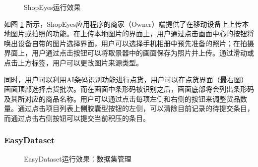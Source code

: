 \begin{figure}[htbp]
    \hfill
	\caption{ShopEyes运行效果}
	\label{fig:seo}
\end{figure}

如图 \ref{fig:seo} 所示，ShopEyes应用程序的商家（Owner）端提供了在移动设备上上传本地图片或拍照的功能。在上传本地图片的界面上，用户通过点击画面中心的按钮将唤出设备自带的图片选择界面，用户可以选择手机相册中预先准备的照片；在拍摄界面上，用户通过点击按钮可以将取景器中的画面保存为照片并上传。通过滑动或点击上方标签，用户可以更改图片来源类型。

同时，用户可以利用AI条码识别功能进行点货，用户可以在点货界面（最右图）画面顶部选择点货批次。而在画面中条形码被识别之后，画面底部将会列出条形码及其所对应的商品名称。用户可以通过点击每项左侧和右侧的按钮来调整货品数量。通过点击项目列表上侧胶囊型按钮的左侧，可以清除目前记录的待提交条目，而通过点击右侧按钮可以提交当前积压的条目。

\subsubsection{EasyDataset}

\begin{figure}[htbp]
    \centering
    \hfill
	\caption{EasyDataset运行效果：数据集管理}
	\label{fig:ed-nd}
\end{figure}

